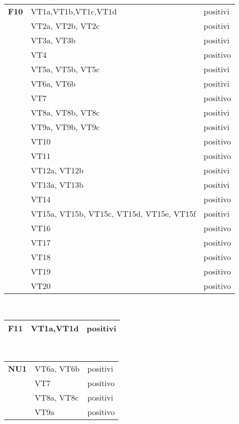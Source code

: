  \begin{center}
\begin{tabular}{|p{2cm}|p{7cm}|p{2cm}|} \hline
\textbf{F10} & VT1a,VT1b,VT1c,VT1d & positivi\\ \cline{2-3}
&  VT2a, VT2b, VT2c & positivi\\ \cline{2-3}
&  VT3a, VT3b & positivi\\ \cline{2-3}
&  VT4 & positivo\\ \cline{2-3}
&  VT5a, VT5b, VT5c & positivi\\ \cline{2-3}
&  VT6a, VT6b & positivi\\ \cline{2-3}
&  VT7 & positivo\\ \cline{2-3}
&  VT8a, VT8b, VT8c & positivi\\ \cline{2-3}
&  VT9a, VT9b, VT9c & positivi\\ \cline{2-3}
&  VT10 & positivo\\ \cline{2-3}
&  VT11 & positivo\\ \cline{2-3}
&  VT12a, VT12b & positivi\\ \cline{2-3}
&  VT13a, VT13b & positivi\\ \cline{2-3}
&  VT14 & positivo\\ \cline{2-3}
&  VT15a, VT15b, VT15c, VT15d, VT15e, VT15f & positivi\\ \cline{2-3}
&  VT16 & positivo\\ \cline{2-3}
&  VT17 & positivo\\ \cline{2-3}
&  VT18 & positivo\\ \cline{2-3}
&  VT19 & positivo\\ \cline{2-3}
&  VT20 & positivo \\ \hline
\end{tabular} \\
\end{center}

 \begin{center}
\begin{tabular}{|p{2cm}|p{7cm}|p{2cm}|} \hline
\textbf{F11} & VT1a,VT1d & positivi\\ \hline
\end{tabular} \\
\end{center}

 \begin{center}
\begin{tabular}{|p{2cm}|p{7cm}|p{2cm}|} \hline
\textbf{NU1} & VT6a, VT6b& positivi\\ \cline{2-3}
& VT7& positivo\\ \cline{2-3}
&  VT8a, VT8c& positivi\\ \cline{2-3}
&  VT9a & positivo \\ \hline
\end{tabular} \\
\end{center}

